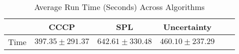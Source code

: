 \documentclass[12pt]{article}
\begin{document}
\begin{table}
\caption{Average Run Time (Seconds) Across Algorithms}
\begin{center}
\begin{tabular}{|c|c|c|c|c|c|}
\hline & CCCP & SPL & Uncertainty \\\hline
Time & $397.35 \pm 291.37$ & $642.61 \pm 330.48$ & $460.10 \pm 237.29$\\\hline
\end{tabular}
\end{center}
\end{table}
\end{document}
